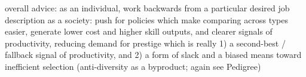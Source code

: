 \documentclass[review]{elsarticle}
\begin{document}
overall advice: as an individual, work backwards from a particular desired job description
as a society: push for policies which make comparing across types easier, generate lower cost and higher skill outputs,
and clearer signals of productivity, reducing demand for prestige which is really 1) a second-best / fallback signal of productivity,
and 2) a form of slack and a biased means toward inefficient selection (anti-diversity as a byproduct; again see Pedigree)


\end{document}
